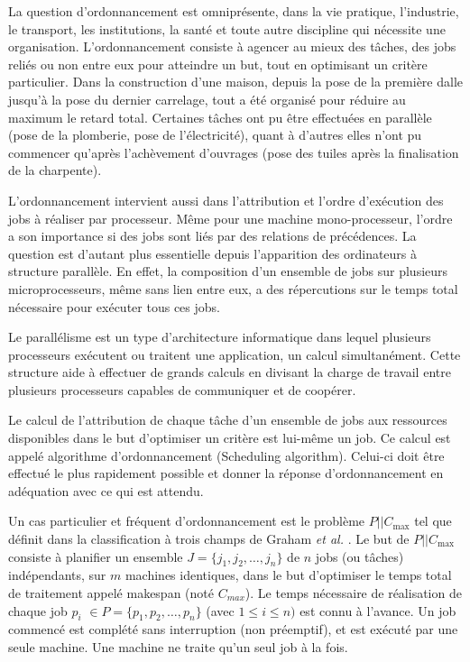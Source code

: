 \documentclass[a4paper,12pt]{report}
\theoremstyle{plain}				%
\theoremstyle{definition}				%
\newcommand\problemGrahamP{$P||C_{\max}$\xspace}
\begin{document}
La question d’ordonnancement est omniprésente, dans la vie pratique, l'industrie, le transport, 
  les institutions, la santé et toute autre discipline qui nécessite une organisation.
  L'ordonnancement consiste à agencer au mieux des tâches, des jobs reliés ou non entre eux 
  pour atteindre un but, tout en optimisant un critère particulier. 
Dans la construction d'une maison, depuis la pose de la première dalle jusqu'à la pose du dernier carrelage, 
  tout a été organisé pour réduire au maximum le retard total. 
  Certaines tâches ont pu être effectuées en parallèle (pose de la plomberie, pose de l'électricité), 
  quant à d'autres elles n'ont pu commencer qu'après l'achèvement d'ouvrages 
  (pose des tuiles après la finalisation de la charpente). 

L’ordonnancement intervient aussi dans l'attribution et l'ordre d’exécution des jobs à réaliser par processeur. 
Même pour une machine mono-processeur, l'ordre a son importance si des jobs sont liés par des relations de précédences. 
La question est d'autant plus essentielle depuis l'apparition des ordinateurs à structure parallèle.
En effet, la composition d'un ensemble de jobs sur plusieurs microprocesseurs, même sans lien entre eux, a des répercutions sur le temps total nécessaire pour exécuter tous ces jobs. 

Le parallélisme est un type d'architecture informatique dans lequel plusieurs processeurs exécutent 
  ou traitent une application, un calcul simultanément. 
Cette structure aide à effectuer de grands calculs en divisant la charge de travail entre plusieurs 
  processeurs capables de communiquer et de coopérer.     

Le calcul de l'attribution de chaque tâche d'un ensemble de jobs aux ressources disponibles dans le but d'optimiser un critère est lui-même un job. 
Ce calcul est appelé algorithme d'ordonnancement (Scheduling algorithm). 
Celui-ci doit être effectué le plus rapidement possible et donner la réponse d'ordonnancement en 
  adéquation avec ce qui est attendu.


Un cas particulier et fréquent d'ordonnancement est le problème \problemGrahamP tel que définit 
  dans la classification à trois champs de Graham \emph{et al.} \cite{graham1979optimization}. 
Le but de \problemGrahamP consiste à planifier un ensemble $J=\{j_1, j_2, \ldots, j_n\}$ de 
  $n$ jobs (ou tâches) indépendants, 
  sur $m$ machines identiques,  
  dans le but d'optimiser le temps total de traitement appelé makespan (noté $C_{max}$).
Le temps nécessaire de réalisation de chaque job $p_i$ $\in P=\{p_1, p_2, \ldots, p_n\}$  
  (avec $1 \leq i \leq n)$ est connu à l'avance. 
Un job commencé est complété sans interruption (non préemptif), 
  et est exécuté par une seule machine. 
Une machine ne traite qu'un seul job à la fois. 
\end{document}
